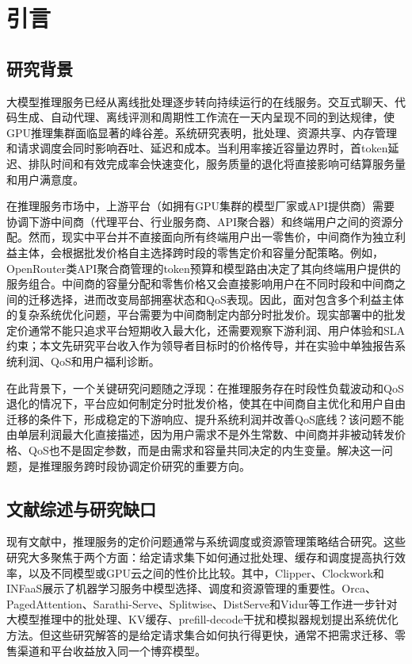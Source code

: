 \documentclass[UTF8,11pt]{ctexart}
\begin{document}
\section{引言}

\subsection{研究背景}

大模型推理服务已经从离线批处理逐步转向持续运行的在线服务。交互式聊天、代码生成、自动代理、离线评测和周期性工作流在一天内呈现不同的到达规律，使GPU推理集群面临显著的峰谷差。系统研究表明，批处理、资源共享、内存管理和请求调度会同时影响吞吐、延迟和成本\cite{crankshaw2017clipper,gujarati2020clockwork,romero2021infaas,yu2022orca,kwon2023pagedattention,agrawal2024sarathiserve}。当利用率接近容量边界时，首token延迟、排队时间和有效完成率会快速变化，服务质量的退化将直接影响可结算服务量和用户满意度。

在推理服务市场中，上游平台（如拥有GPU集群的模型厂家或API提供商）需要协调下游中间商（代理平台、行业服务商、API聚合器）和终端用户之间的资源分配。然而，现实中平台并不直接面向所有终端用户出一零售价，中间商作为独立利益主体，会根据批发价格自主选择跨时段的零售定价和容量分配策略。例如，OpenRouter类API聚合商管理的token预算和模型路由决定了其向终端用户提供的服务组合。中间商的容量分配和零售价格又会直接影响用户在不同时段和中间商之间的迁移选择，进而改变局部拥塞状态和QoS表现。因此，面对包含多个利益主体的复杂系统优化问题，平台需要为中间商制定内部分时批发价。现实部署中的批发定价通常不能只追求平台短期收入最大化，还需要观察下游利润、用户体验和SLA约束；本文先研究平台收入作为领导者目标时的价格传导，并在实验中单独报告系统利润、QoS和用户福利诊断。

在此背景下，一个关键研究问题随之浮现：在推理服务存在时段性负载波动和QoS退化的情况下，平台应如何制定分时批发价格，使其在中间商自主优化和用户自由迁移的条件下，形成稳定的下游响应、提升系统利润并改善QoS底线？该问题不能由单层利润最大化直接描述，因为用户需求不是外生常数、中间商并非被动转发价格、QoS也不是固定参数，而是由需求和容量共同决定的内生变量。解决这一问题，是推理服务跨时段协调定价研究的重要方向。

\subsection{文献综述与研究缺口}
\label{sec:related_work}

现有文献中，推理服务的定价问题通常与系统调度或资源管理策略结合研究\cite{crankshaw2017clipper,yu2022orca,kwon2023pagedattention}。这些研究大多聚焦于两个方面：给定请求集下如何通过批处理、缓存和调度提高执行效率，以及不同模型或GPU云之间的性价比比较。其中，Clipper、Clockwork和INFaaS展示了机器学习服务中模型选择、调度和资源管理的重要性\cite{crankshaw2017clipper,gujarati2020clockwork,romero2021infaas}。Orca、PagedAttention、Sarathi-Serve、Splitwise、DistServe和Vidur等工作进一步针对大模型推理中的批处理、KV缓存、prefill-decode干扰和模拟器规划提出系统优化方法\cite{yu2022orca,kwon2023pagedattention,agrawal2024sarathiserve,patel2024splitwise,zhong2024distserve,agrawal2024vidur}。但这些研究解答的是给定请求集合如何执行得更快，通常不把需求迁移、零售渠道和平台收益放入同一个博弈模型。
\end{document}
